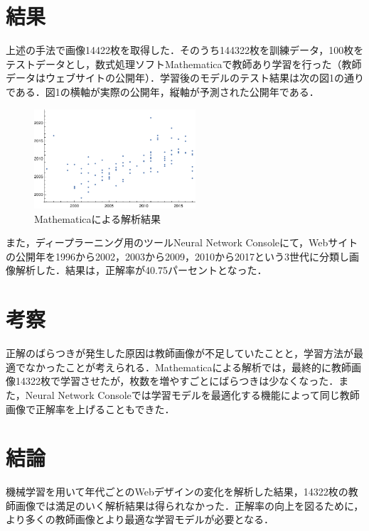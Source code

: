 \documentclass[uplatex,twocolumn,dvipdfmx]{jsarticle}
\begin{document}
\section{結果}

上述の手法で画像14422枚を取得した．そのうち144322枚を訓練データ，100枚をテストデータとし，数式処理ソフトMathematicaで教師あり学習を行った（教師データはウェブサイトの公開年）．学習後のモデルのテスト結果は次の図1の通りである．図1の横軸が実際の公開年，縦軸が予測された公開年である．\vspace{0.2in} \\

\vspace{-1zh}
\begin{figure}[htb]
\centering
\includegraphics[width=6cm,clip]{graph.pdf}
\caption{Mathematicaによる解析結果}
\end{figure}
\vspace{-1zh}

また，ディープラーニング用のツールNeural Network Consoleにて，Webサイトの公開年を1996から2002，2003から2009，2010から2017という3世代に分類し画像解析した．結果は，正解率が40.75パーセントとなった．

\section{考察}

正解のばらつきが発生した原因は教師画像が不足していたことと，学習方法が最適でなかったことが考えられる．Mathematicaによる解析では，最終的に教師画像14322枚で学習させたが，枚数を増やすごとにばらつきは少なくなった．また，Neural Network Consoleでは学習モデルを最適化する機能によって同じ教師画像で正解率を上げることもできた．

\section{結論}

機械学習を用いて年代ごとのWebデザインの変化を解析した結果，14322枚の教師画像では満足のいく解析結果は得られなかった．正解率の向上を図るために，より多くの教師画像とより最適な学習モデルが必要となる．


\end{document}

